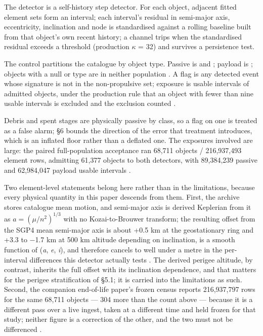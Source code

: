 \documentclass[11pt]{article}
\begin{document}
The detector is a self-history step detector. For each object, adjacent fitted element sets form an interval; each interval's residual in semi-major axis, eccentricity, inclination and node is standardised against a rolling baseline built from that object's own recent history; a channel trips when the standardised residual exceeds a threshold (production $\kappa$ = 32) and survives a persistence test.

The control partitions the catalogue by object type. Passive is  and ; payload is ; objects with a null or  type are in neither population%
. A flag is any detected event whose signature is not in the non-propulsive set; exposure is usable intervals of admitted objects, under the production rule that an object with fewer than nine usable intervals is excluded and the exclusion counted%
.

Debris and spent stages are physically passive by class, so a flag on one is treated as a false alarm; \S{}6 bounds the direction of the error that treatment introduces, which is an inflated floor rather than a deflated one. The exposures involved are large: the paired full-population acceptance ran 68,711 objects / 216,937,493 element rows, admitting 61,377 objects to both detectors, with 89,384,239 passive and 62,984,047 payload usable intervals%
.

Two element-level statements belong here rather than in the limitations, because every physical quantity in this paper descends from them. First, the archive stores catalogue mean motion, and semi-major axis is derived Keplerian from it as $a = (\mu/n^2)^{1/3}$ with no Kozai-to-Brouwer transform; the resulting offset from the SGP4 mean semi-major axis is about +0.5 km at the geostationary ring and +3.3 to $-$1.7 km at 500 km altitude depending on inclination, is a smooth function of (\emph{a}, \emph{e}, \emph{i}), and therefore cancels to well under a metre in the per-interval differences this detector actually tests%
. The derived perigee altitude, by contrast, inherits the full offset with its inclination dependence, and that matters for the perigee stratification of \S{}5.1; it is carried into the limitations as such. Second, the companion end-of-life paper's frozen census reports 216,937,797 rows for the same 68,711 objects --- 304 more than the count above --- because it is a different pass over a live ingest, taken at a different time and held frozen for that study; neither figure is a correction of the other, and the two must not be differenced%
.
\end{document}
